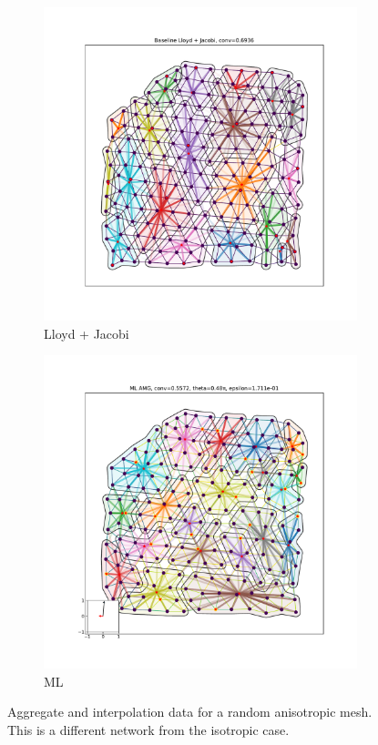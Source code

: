 \documentclass{article}
\begin{document}
\begin{figure}[h]
\begin{subfigure}[t]{0.32\textwidth}
    \includegraphics[width=\textwidth, trim=80 70 70 50, clip]{grid_anis_3_lloyd.pdf}
    \caption{Lloyd + Jacobi}
  \end{subfigure}
  \begin{subfigure}[t]{0.32\textwidth}
    \centering
    \includegraphics[width=\textwidth, trim=80 70 70 50, clip]{grid_anis_3_ml.pdf}
    \caption{ML}
  \end{subfigure}
  \caption{Aggregate and interpolation data for a random anisotropic mesh.  This is a different network from the isotropic case.}
  \label{fig:grid_anis_3}
\end{figure}
\end{document}
